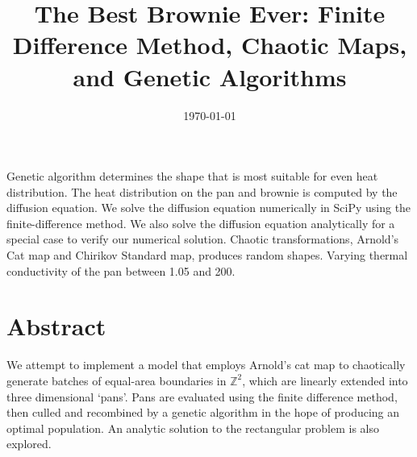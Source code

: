 \documentclass[12pt]{reedmcm}
\title{\textbf{The Best Brownie Ever: Finite Difference Method, Chaotic Maps, and Genetic Algorithms}}
\date{\today}
\begin{document}

\begin{summary}
  Genetic algorithm determines the shape that is most suitable for even heat distribution.
  The heat distribution on the pan and brownie is computed by the diffusion equation.
  We solve the diffusion equation numerically in SciPy using the finite-difference method.
  We also solve the diffusion equation analytically for a special case to verify our numerical solution.
  Chaotic transformations, Arnold's Cat map and Chirikov Standard map, produces random shapes.
  Varying thermal conductivity of the pan between 1.05 and 200.

  \end{summary}

\maketitle
\tableofcontents
\listoffigures
\section{Abstract}
We attempt to implement a model that employs Arnold's cat map to chaotically generate batches of equal-area boundaries in $\mathbb{Z}^2$, which are linearly extended into three dimensional `pans'.  Pans are evaluated using the finite difference method, then culled and recombined by a genetic algorithm in the hope of producing an optimal population.  An analytic solution to the rectangular problem is also explored.
\end{document}
